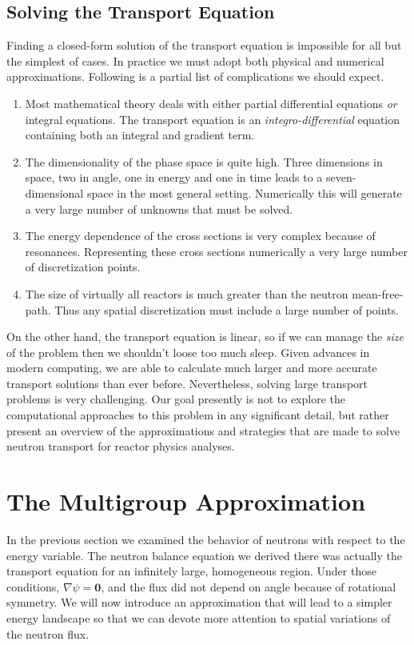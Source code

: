\documentclass[11pt]{article}
\renewcommand\vec{\mathbf}
\begin{document}
\subsection{Solving the Transport Equation}
\label{sec:orgheadline9}
Finding a closed-form solution of the transport equation is impossible for all but the simplest of cases.  In practice we must adopt both physical and numerical approximations.  Following is a partial list of complications we should expect.
\begin{enumerate}
\item Most mathematical theory deals with either partial differential equations \emph{or} integral equations.  The transport equation is an \emph{integro-differential} equation containing both an integral and gradient term.
\item The dimensionality of the phase space is quite high.  Three dimensions in space, two in angle, one in energy and one in time leads to a seven-dimensional space in the most general setting.  Numerically this will generate a very large number of unknowns that must be solved.
\item The energy dependence of the cross sections is very complex because of resonances.  Representing these cross sections numerically a very large number of discretization points.
\item The size of virtually all reactors is much greater than the neutron mean-free-path.  Thus any spatial discretization must include a large number of points.
\end{enumerate}

On the other hand, the transport equation is linear, so if we can manage the \emph{size} of the problem then we shouldn't loose too much sleep.  Given advances in modern computing, we are able to calculate much larger and more accurate transport solutions than ever before.  Nevertheless, solving large transport problems is very challenging.  Our goal presently is not to explore the computational approaches to this problem in any significant detail, but rather present an overview of the approximations and strategies that are made to solve neutron transport for reactor physics analyses.

\section{The Multigroup Approximation}
\label{sec:orgheadline11}
In the previous section we examined the behavior of neutrons with respect to the energy variable.  The neutron balance equation we derived there was actually the transport equation for an infinitely large, homogeneous region.  Under those conditions, \(\nabla\psi = \vec{0}\), and the flux did not depend on angle because of rotational symmetry.  We will now introduce an approximation that will lead to a simpler energy landscape so that we can devote more attention to spatial variations of the neutron flux.
\end{document}
